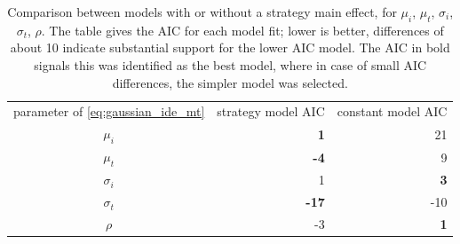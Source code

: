 \documentclass[acmlarge, manuscript,review]{acmart}
\begin{document}
\begin{table}[htbp]
	\centering
	\caption{Comparison between models with or without a strategy main effect, for $\mu_i$, $\mu_t$, $\sigma_i$, $\sigma_t$, $\rho$. The table gives the AIC for each model fit; lower is better, differences of about 10 indicate substantial support for the lower AIC model. The AIC in bold signals this was identified as the best model, where in case of small AIC differences, the simpler model was selected.}
	\label{tab:aic_gop}
	\begin{tabular}{c rr}
	parameter of \autoref{eq:gaussian_ide_mt}	 & strategy model AIC & constant model AIC\\
	$\mu_i$ &  \textbf{1} & 21 \\
	$\mu_t$ & \textbf{-4} & 9 \\
	$\sigma_i$ & 1 & \textbf{3} \\
	$\sigma_t$ & \textbf{-17} & -10 \\
	$\rho$ &  -3& \textbf{1} \\
	\end{tabular}
\end{table}
\end{document}
